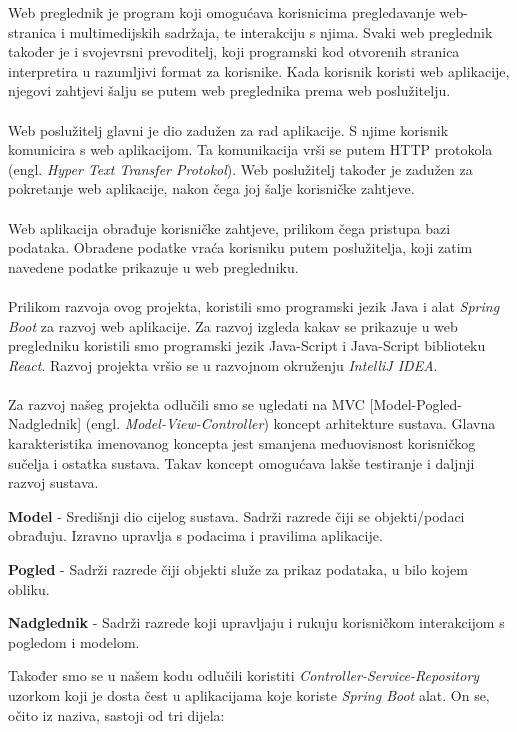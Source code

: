 		\text	Web preglednik je program koji omogućava korisnicima pregledavanje web-stranica i multimedijskih sadržaja, te interakciju s njima. Svaki web preglednik također je i svojevrsni prevoditelj, koji programski kod otvorenih stranica interpretira u razumljivi format za korisnike. Kada korisnik koristi web aplikacije, njegovi zahtjevi šalju se putem web preglednika prema web poslužitelju. \\
		\\
		\text	Web poslužitelj glavni je dio zadužen za rad aplikacije. S njime korisnik komunicira s web aplikacijom. Ta komunikacija vrši se putem HTTP protokola (engl. \textit{Hyper Text Transfer Protokol}). Web poslužitelj također je zadužen za pokretanje web aplikacije, nakon čega joj šalje korisničke zahtjeve. \\
		\\
		\text	Web aplikacija obrađuje korisničke zahtjeve, prilikom čega pristupa bazi podataka. Obrađene podatke vraća korisniku putem poslužitelja, koji zatim navedene podatke prikazuje u web pregledniku. \\
		\\
		\text	Prilikom razvoja ovog projekta, koristili smo programski jezik Java i alat \textit{Spring Boot} za razvoj web aplikacije. Za razvoj izgleda kakav se prikazuje u web pregledniku koristili smo programski jezik Java-Script i Java-Script biblioteku \textit{React}. Razvoj projekta vršio se u razvojnom okruženju \textit{IntelliJ IDEA}.  \\
		\\
		\text	Za razvoj našeg projekta odlučili smo se ugledati na MVC [Model-Pogled-Nadglednik] (engl. \textit{Model-View-Controller}) koncept arhitekture sustava. Glavna karakteristika imenovanog koncepta jest smanjena međuovisnost korisničkog sučelja i ostatka sustava. Takav koncept omogućava lakše testiranje i daljnji razvoj sustava.
		\begin{packed_item}
			\item \textbf{Model} - Središnji dio cijelog sustava. Sadrži razrede čiji se objekti/podaci obrađuju. Izravno upravlja s podacima i pravilima aplikacije.
			\item \textbf{Pogled} - Sadrži razrede čiji objekti služe za prikaz podataka, u bilo kojem obliku.
			\item \textbf{Nadglednik} - Sadrži razrede koji upravljaju i rukuju korisničkom interakcijom s pogledom i modelom. 
		\end{packed_item}
		\text	Također smo se u našem kodu odlučili koristiti \textit{Controller-Service-Repository} uzorkom koji je dosta čest u aplikacijama koje koriste \textit{Spring Boot} alat. On se, očito iz naziva, sastoji od tri dijela:
